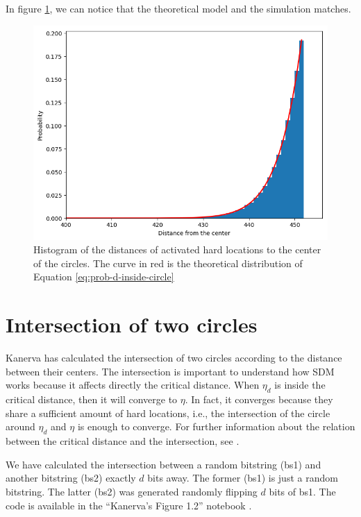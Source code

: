 In figure \ref{fig:validation-distance-activated-hls}, we can notice that the theoretical model and the simulation matches.

\begin{figure}[!htb]
\centering\includegraphics[width=\textwidth]{./images02/new-images/distance-activated-hls.png}

\caption{Histogram of the distances of activated hard locations to the center of the circles. The curve in red is the theoretical distribution of Equation \ref{eq:prob-d-inside-circle}
\label{fig:validation-distance-activated-hls}}
\end{figure}

\section{Intersection of two circles}

Kanerva has calculated the intersection of two circles according to the distance between their centers. The intersection is important to understand how SDM works because it affects directly the critical distance. When $\eta_d$ is inside the critical distance, then it will converge to $\eta$. In fact, it converges because they share a sufficient amount of hard locations, i.e., the intersection of the circle around $\eta_d$ and $\eta$ is enough to converge. For further information about the relation between the critical distance and the intersection, see \citet{brogliato2014sparse}.

We have calculated the intersection between a random bitstring (bs1) and another bitstring (bs2) exactly $d$ bits away. The former (bs1) is just a random bitstring. The latter (bs2) was generated randomly flipping $d$ bits of bs1. The code is available in the ``Kanerva's Figure 1.2'' notebook \citep{sdmframework}.

